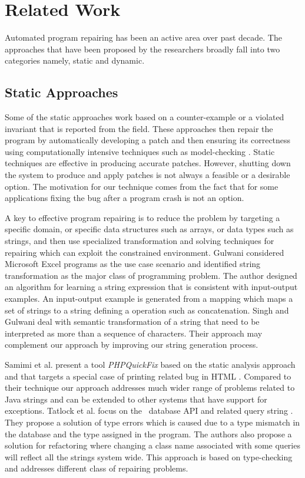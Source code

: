 \section{Related Work}
\label{sec:relatedWork}

Automated program repairing has been an active
area over past decade. The approaches that have been proposed by the researchers
broadly fall into two categories namely, static and dynamic.

\subsection{Static Approaches}
Some of the static approaches work based on a counter-example or a violated
invariant that is reported from the field. These approaches then repair the
program by automatically developing a patch and then ensuring its correctness
using computationally intensive techniques such as model-checking
\cite{biere2014, wei-issta-2010}. Static techniques are effective in producing accurate patches.
However, shutting down the system to produce and apply patches is not always a feasible or
a desirable option. The motivation for our technique comes from the fact that for some
applications fixing the bug after a program crash is not an option.

A key to effective program repairing is to reduce the problem by 
targeting a specific domain, or specific data structures such as arrays, or data types such as strings, and then use
specialized transformation and solving techniques for repairing which can exploit the constrained environment.
Gulwani \cite{Gulwani:2011} considered Microsoft Excel programs as the use case scenario and
identified string transformation as the major class of programming problem.
The author designed an algorithm for learning a string expression
that is consistent with input-output examples. An input-output example is
generated from a mapping which maps a set of strings to a string defining a
operation such as concatenation.
Singh and Gulwani \cite{Singh:2012} deal with semantic transformation of a string that need 
to be interpreted as more than a sequence of
characters. Their approach may complement our approach by
improving our string generation process.

Samimi et al. present a tool \textit{PHPQuickFix} based on the static analysis approach and that
targets a special case of printing related bug in HTML \cite{SamirniSAMTH12}. Compared to their technique our
approach addresses much wider range of problems related to Java strings and can be extended to
other systems that have support for exceptions.
Tatlock et al. focus on the \java\ database API and related query string
\cite{Tatlock:2008}. They
propose a solution of type errors which is caused due to a type mismatch in
the database and the type assigned in the program. The authors also propose a
solution for refactoring where changing a class name associated with some
queries will reflect all the strings system wide. This approach is based on type-checking
and addresses different class of repairing problems.


